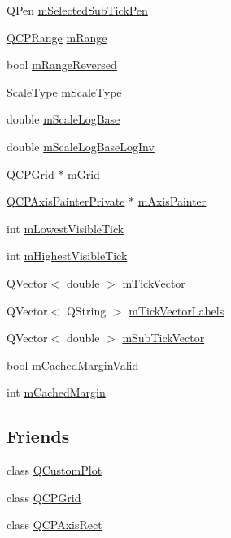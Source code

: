\begin{DoxyCompactItemize}
\item 
Q\+Pen \hyperlink{class_q_c_p_axis_aa5cc6afc5dc2a365f5abbd36eb04a1dc}{m\+Selected\+Sub\+Tick\+Pen}
\item 
\hyperlink{class_q_c_p_range}{Q\+C\+P\+Range} \hyperlink{class_q_c_p_axis_a1ee36773c49062d751560e11f90845f7}{m\+Range}
\item 
bool \hyperlink{class_q_c_p_axis_a5cb034f57aa3d773a9ca55a0931dbf7b}{m\+Range\+Reversed}
\item 
\hyperlink{class_q_c_p_axis_a36d8e8658dbaa179bf2aeb973db2d6f0}{Scale\+Type} \hyperlink{class_q_c_p_axis_ad706039549cbbbec5fcb2baf7894e04d}{m\+Scale\+Type}
\item 
double \hyperlink{class_q_c_p_axis_abc727ddb4af745151755d1b5e60d03c3}{m\+Scale\+Log\+Base}
\item 
double \hyperlink{class_q_c_p_axis_a93e068984b475467929e7f6768754227}{m\+Scale\+Log\+Base\+Log\+Inv}
\item 
\hyperlink{class_q_c_p_grid}{Q\+C\+P\+Grid} $\ast$ \hyperlink{class_q_c_p_axis_a17bffb94aaa40311f259c6ac7bcb5d5f}{m\+Grid}
\item 
\hyperlink{class_q_c_p_axis_painter_private}{Q\+C\+P\+Axis\+Painter\+Private} $\ast$ \hyperlink{class_q_c_p_axis_aeeae00935bd2dab82d64f32544a90913}{m\+Axis\+Painter}
\item 
int \hyperlink{class_q_c_p_axis_aebb24ba8734b7e054efc6e1ecc5414c7}{m\+Lowest\+Visible\+Tick}
\item 
int \hyperlink{class_q_c_p_axis_abb3b3ccce7e9779fef2be91ce1a46ef0}{m\+Highest\+Visible\+Tick}
\item 
Q\+Vector$<$ double $>$ \hyperlink{class_q_c_p_axis_aae0f9b9973b85be601200f00f5825087}{m\+Tick\+Vector}
\item 
Q\+Vector$<$ Q\+String $>$ \hyperlink{class_q_c_p_axis_aeee4bd0fca3f587eafe33843d1cb4f82}{m\+Tick\+Vector\+Labels}
\item 
Q\+Vector$<$ double $>$ \hyperlink{class_q_c_p_axis_a28353081e0ff35c3fe5ced923a287faa}{m\+Sub\+Tick\+Vector}
\item 
bool \hyperlink{class_q_c_p_axis_a2cde37b6e385f47e11322df4ac1b0e9b}{m\+Cached\+Margin\+Valid}
\item 
int \hyperlink{class_q_c_p_axis_a48ace55cbd54f7241e7f1b06fd369b64}{m\+Cached\+Margin}
\end{DoxyCompactItemize}
\subsection*{Friends}
\begin{DoxyCompactItemize}
\item 
class \hyperlink{class_q_c_p_axis_a1cdf9df76adcfae45261690aa0ca2198}{Q\+Custom\+Plot}
\item 
class \hyperlink{class_q_c_p_axis_a061e177f585549fc31f780852e2bd6fe}{Q\+C\+P\+Grid}
\item 
class \hyperlink{class_q_c_p_axis_acbf20ecb140f66c5fd1bc64ae0762990}{Q\+C\+P\+Axis\+Rect}
\end{DoxyCompactItemize}


